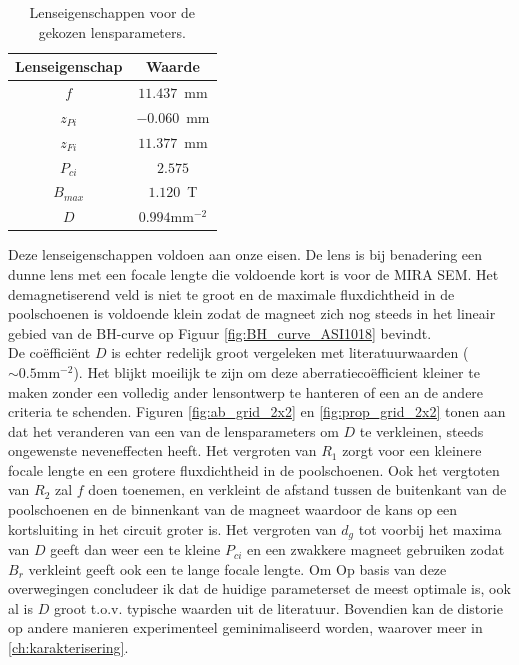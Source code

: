 \documentclass[we,twoside,openright,a4paper,11pt]{uantwerpenbamathesis}
\begin{document}
\begin{table}[H]
\centering
\begin{tabular}{@{}cl@{}}
\toprule
Lenseigenschap                     & \multicolumn{1}{c}{Waarde}  \\ \midrule
\multicolumn{1}{|c|}{$f$}        & \multicolumn{1}{c|}{$11.437$~mm}  \\ \midrule
\multicolumn{1}{|c|}{$z_{Pi}$}        & \multicolumn{1}{c|}{$-0.060$~mm} \\ \midrule
\multicolumn{1}{|c|}{$z_{Fi}$}        & \multicolumn{1}{c|}{$11.377$~mm}  \\ \midrule
\multicolumn{1}{|c|}{$P_{ci}$} & \multicolumn{1}{c|}{$2.575$}  \\ \midrule
\multicolumn{1}{|c|}{$B_{max}$} & \multicolumn{1}{c|}{$1.120$~T}    \\ \midrule
\multicolumn{1}{|c|}{$D$}        & \multicolumn{1}{c|}{$0.994\mathrm{mm}^{-2}$}    \\ \midrule
\end{tabular}
\caption{Lenseigenschappen voor de gekozen lensparameters.}\label{tab:lens_properties}
\end{table}

Deze lenseigenschappen voldoen aan onze eisen. De lens is bij benadering een dunne lens met een focale lengte die voldoende kort is voor de MIRA SEM. Het demagnetiserend veld is niet te groot en de maximale fluxdichtheid in de poolschoenen is voldoende klein zodat de magneet zich nog steeds in het lineair gebied van de $\mathrm{BH}$-curve op Figuur \ref{fig:BH_curve_ASI1018} bevindt.\\

De coëfficiënt $D$ is echter redelijk groot vergeleken met literatuurwaarden ($\sim 0.5\mathrm{mm}^{-2}$). Het blijkt moeilijk te zijn om deze aberratiecoëfficient kleiner te maken zonder een volledig ander lensontwerp te hanteren of een an de andere criteria te schenden. Figuren \ref{fig:ab_grid_2x2} en \ref{fig:prop_grid_2x2} tonen aan dat het veranderen van een van de lensparameters om $D$ te verkleinen, steeds ongewenste neveneffecten heeft. Het vergroten van $R_1$ zorgt voor een kleinere focale lengte en een grotere fluxdichtheid in de poolschoenen. Ook het vergtoten van $R_2$ zal $f$ doen toenemen, en verkleint de afstand tussen de buitenkant van de poolschoenen en de binnenkant van de magneet waardoor de kans op een kortsluiting in het circuit groter is. Het vergroten van $d_g$ tot voorbij het maxima van $D$ geeft dan weer een te kleine $P_{ci}$ en een zwakkere magneet gebruiken zodat $B_r$ verkleint geeft ook een te lange focale lengte. Om Op basis van deze overwegingen concludeer ik dat de huidige parameterset de meest optimale is, ook al is $D$ groot t.o.v. typische waarden uit de literatuur. Bovendien kan de distorie op andere manieren experimenteel geminimaliseerd worden, waarover meer in \ref{ch:karakterisering}.\\
\end{document}
